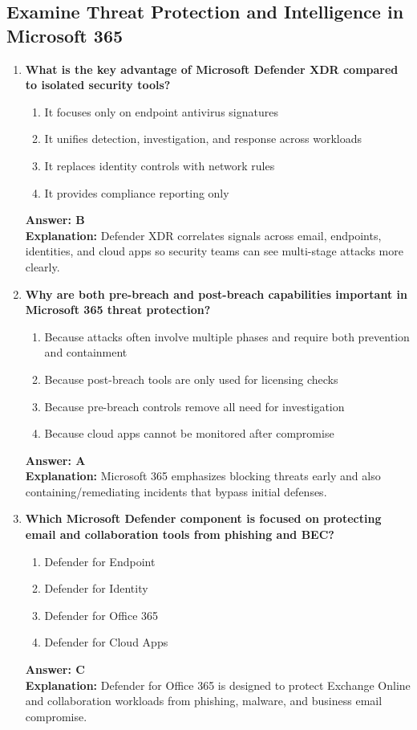 \documentclass[10pt]{article}
\begin{document}
\subsection{Examine Threat Protection and Intelligence in Microsoft 365}
\begin{enumerate}[leftmargin=*]

\item \textbf{What is the key advantage of Microsoft Defender XDR compared to isolated security tools?}
\begin{enumerate}[label=\Alph*.]
  \item It focuses only on endpoint antivirus signatures
  \item It unifies detection, investigation, and response across workloads
  \item It replaces identity controls with network rules
  \item It provides compliance reporting only
\end{enumerate}
\textbf{Answer: B}\\
\textbf{Explanation:} Defender XDR correlates signals across email, endpoints, identities, and cloud apps so security teams can see multi-stage attacks more clearly.

\item \textbf{Why are both pre-breach and post-breach capabilities important in Microsoft 365 threat protection?}
\begin{enumerate}[label=\Alph*.]
  \item Because attacks often involve multiple phases and require both prevention and containment
  \item Because post-breach tools are only used for licensing checks
  \item Because pre-breach controls remove all need for investigation
  \item Because cloud apps cannot be monitored after compromise
\end{enumerate}
\textbf{Answer: A}\\
\textbf{Explanation:} Microsoft 365 emphasizes blocking threats early and also containing/remediating incidents that bypass initial defenses.

\item \textbf{Which Microsoft Defender component is focused on protecting email and collaboration tools from phishing and BEC?}
\begin{enumerate}[label=\Alph*.]
  \item Defender for Endpoint
  \item Defender for Identity
  \item Defender for Office 365
  \item Defender for Cloud Apps
\end{enumerate}
\textbf{Answer: C}\\
\textbf{Explanation:} Defender for Office 365 is designed to protect Exchange Online and collaboration workloads from phishing, malware, and business email compromise.


\end{enumerate}
\end{document}
